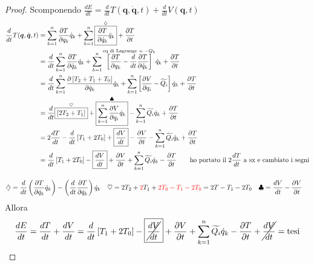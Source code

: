 \documentclass[a4paper,10pt]{article}
\theoremstyle{definition}
\newcommand{\bv}{\boldsymbol} %
\theoremstyle{indentdefinition}
\theoremstyle{indenttheorem}
\theoremstyle{myremark}
\theoremstyle{indentgeneral}
\begin{document}
\begin{proof}
Scomponendo $\frac{dE}{dt}=\frac{d}{dt}T(\bv{q},\dot{\bv{q}},t)+\frac{d}{dt}V\left(\bv{q},t\right)$
\begin{align*}
\frac{d}{dt}T(\bv{q},\dot{\bv{q}},t) & =\sum_{k=1}^{n}\frac{\partial T}{\partial q_{k}}\dot{q}_{k}+\sum_{k=1}^{n}\overset{\diamondsuit}{\boxed{\frac{\partial T}{\partial\dot{q}_{k}}\ddot{q}_{k}}}+\frac{\partial T}{\partial t} \\
&=\frac{d}{dt}\sum_{k=1}^{n}\frac{\partial T}{\partial\dot{q}_{k}}\dot{q}_{k}+\sum_{k=1}^{n}\overset{\text{eq di Lagrange \ensuremath{=-Q_{k}}}}{\left[\frac{\partial T}{\partial q_{k}}-\frac{d}{dt}\frac{\partial T}{\partial\dot{q}_{k}}\right]}\dot{q}_{k}+\frac{\partial T}{\partial t}\\
 &=\frac{d}{dt}\sum_{k=1}^{n}\frac{\partial\left[T_{2}+T_{1}+T_{0}\right]}{\partial\dot{q}_{k}}\dot{q}_{k}+\sum_{k=1}^{n}\left[\frac{\partial V}{\partial q_{i}}-\widetilde{Q_{i}}\right]\dot{q}_{k}+\frac{\partial T}{\partial t}\\
 &=\frac{d}{dt}\overset{\heartsuit}{\boxed{\left[2T_{2}+T_{1}\right]}}+\overset{\clubsuit}{\boxed{\sum_{k=1}^{n}\frac{\partial V}{\partial q_{i}}\dot{q}_{k}}}-\sum_{k=1}^{n}\widetilde{Q_{i}}\dot{q}_{k}+\frac{\partial T}{\partial t} \\
 &=2 \frac{dT}{dt}-\frac{d}{dt}\left[T_{1}+2T_{0}\right]+\boxed{\frac{dV}{dt}}-\frac{\partial V}{\partial t}-\sum_{k=1}^{n}\widetilde{Q_{i}}\dot{q}_{k}+\frac{\partial T}{\partial t}  \\
 &= \frac{d}{dt}\left[T_{1}+2T_{0}\right]-\boxed{\frac{dV}{dt}}+\frac{\partial V}{\partial t}+\sum_{k=1}^{n}\widetilde{Q_{i}}\dot{q}_{k}-\frac{\partial T}{\partial t} \quad\quad\text{ho portato il $2 \frac{dT}{dt}$ a sx e cambiato i segni}
\end{align*}

\begin{align*}
\diamondsuit & =\frac{d}{dt}\left(\frac{\partial T}{\partial\dot{q}_{k}}\dot{q}_{k}\right)-\left(\frac{d}{dt}\frac{\partial T}{\partial\dot{q}_{k}}\right)\dot{q}_{k} & \heartsuit & =2T_2+\textcolor{red}{2}T_1+\textcolor{red}{2T_0-T_1-2T_0}=2T-T_1-2T_0 & \clubsuit & =\frac{dV}{dt}-\frac{\partial V}{\partial t}
\end{align*}
Allora
$$\frac{dE}{dt}=\frac{dT}{dt}+\frac{dV}{dt}=\frac{d}{dt}\left[T_{1}+2T_{0}\right]-\boxed{\cancel{\frac{dV}{dt}}}+\frac{\partial V}{\partial t}+\sum_{k=1}^{n}\widetilde{Q_{i}}\dot{q}_{k}-\frac{\partial T}{\partial t}+\cancel{\frac{dV}{dt}}=\text{tesi}$$

\end{proof}
\end{document}
